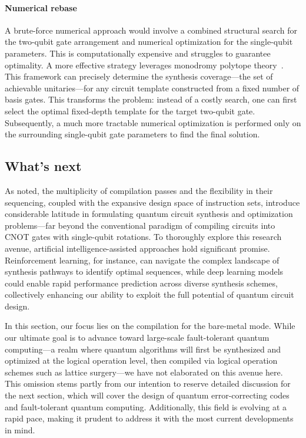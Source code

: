 \documentclass[a4paper,onecolumn,11pt,unpublished]{quantumarticle}
\begin{document}
\paragraph{Numerical rebase}
A brute-force numerical approach would involve a combined structural search for the two-qubit gate arrangement and numerical optimization for the single-qubit parameters. This is computationally expensive and struggles to guarantee optimality.
A more effective strategy leverages monodromy polytope theory~\cite{Peterson2020FixedDepthTwoQubitCircuits}. This framework can precisely determine the synthesis coverage---the set of achievable unitaries---for any circuit template constructed from a fixed number of basis gates. This transforms the problem: instead of a costly search, one can first select the optimal fixed-depth template for the target two-qubit gate. Subsequently, a much more tractable numerical optimization is performed only on the surrounding single-qubit gate parameters to find the final solution.

\subsection{What's next}
As noted, the multiplicity of compilation passes and the flexibility in their sequencing, coupled with the expansive design space of instruction sets, introduce considerable latitude in formulating quantum circuit synthesis and optimization problems---far beyond the conventional paradigm of compiling circuits into CNOT gates with single-qubit rotations. To thoroughly explore this research avenue, artificial intelligence-assisted approaches hold significant promise. Reinforcement learning, for instance, can navigate the complex landscape of synthesis pathways to identify optimal sequences, while deep learning models could enable rapid performance prediction across diverse synthesis schemes, collectively enhancing our ability to exploit the full potential of quantum circuit design.

In this section, our focus lies on the compilation for the bare-metal mode. While our ultimate goal is to advance toward large-scale fault-tolerant quantum computing—a realm where quantum algorithms will first be synthesized and optimized at the logical operation level, then compiled via logical operation schemes such as lattice surgery—we have not elaborated on this avenue here. This omission stems partly from our intention to reserve detailed discussion for the next section, which will cover the design of quantum error-correcting codes and fault-tolerant quantum computing. Additionally, this field is evolving at a rapid pace, making it prudent to address it with the most current developments in mind.
\end{document}
